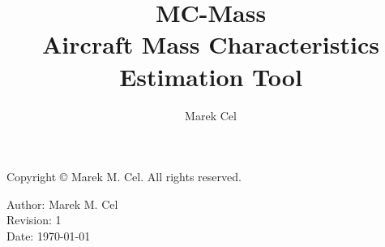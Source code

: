 \documentclass[12pt,a4paper]{report}
\title{MC-Mass \\
\large Aircraft Mass Characteristics Estimation Tool}
\author{Marek Cel}
\date{}
\begin{document}
  
  \maketitle

  \noindent Copyright \copyright{} \the\year{} Marek M. Cel. All rights reserved.

  \noindent Author: Marek M. Cel \\
  Revision: 1 \\
  Date: \today

  
  
  {
    \clearpage
    \setlength{\parskip}{0em}
    \tableofcontents
  }
  
  
  
  
  
  \clearpage
   
  
  
\end{document}
